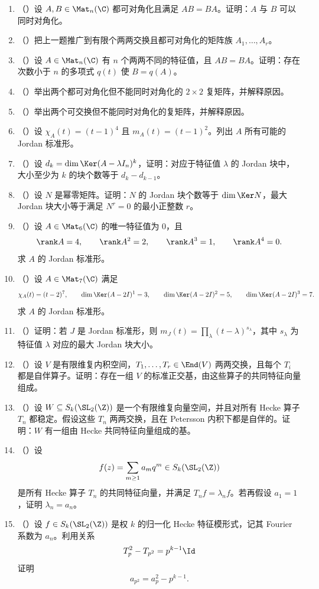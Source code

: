 \begin{enumerate}[label=\arabic*., leftmargin=2.8em, resume]
  \item （\hard）设 \(A,B\in \Mat_n(\C)\) 都可对角化且满足 \(AB=BA\)。证明：\(A\) 与 \(B\) 可以同时对角化。
  \item （\hard）把上一题推广到有限个两两交换且都可对角化的矩阵族 \(A_1,\dots,A_r\)。
  \item （\hard）设 \(A\in \Mat_n(\C)\) 有 \(n\) 个两两不同的特征值，且 \(AB=BA\)。证明：存在次数小于 \(n\) 的多项式 \(q(t)\) 使 \(B=q(A)\)。
  \item （\hard）举出两个都可对角化但不能同时对角化的 \(2\times 2\) 复矩阵，并解释原因。
  \item （\hard）举出两个可交换但不能同时对角化的复矩阵，并解释原因。
  \item （\hard）设 \(\chi_A(t)=(t-1)^4\) 且 \(m_A(t)=(t-1)^2\)。列出 \(A\) 所有可能的 Jordan 标准形。
  \item （\hard）设 \(d_k=\dim\Ker(A-\lambda I_n)^k\)，证明：对应于特征值 \(\lambda\) 的 Jordan 块中，大小至少为 \(k\) 的块个数等于 \(d_k-d_{k-1}\)。
  \item （\hard）设 \(N\) 是幂零矩阵。证明：\(N\) 的 Jordan 块个数等于 \(\dim\Ker N\)，最大 Jordan 块大小等于满足 \(N^r=0\) 的最小正整数 \(r\)。
  \item （\hard）设 \(A\in \Mat_6(\C)\) 的唯一特征值为 \(0\)，且
  \[
  \rank A=4,\qquad \rank A^2=2,\qquad \rank A^3=1,\qquad \rank A^4=0.
  \]
  求 \(A\) 的 Jordan 标准形。
  \item （\hard）设 \(A\in \Mat_7(\C)\) 满足
  \[
  \chi_A(t)=(t-2)^7,
  \qquad \dim\Ker(A-2I)^1=3,
  \qquad \dim\Ker(A-2I)^2=5,
  \qquad \dim\Ker(A-2I)^3=7.
  \]
  求 \(A\) 的 Jordan 标准形。
  \item （\hard）证明：若 \(J\) 是 Jordan 标准形，则 \(m_J(t)=\prod_{\lambda}(t-\lambda)^{s_\lambda}\)，其中 \(s_\lambda\) 为特征值 \(\lambda\) 对应的最大 Jordan 块大小。
  \item （\hard）设 \(V\) 是有限维复内积空间，\(T_1,\dots,T_r\in \End(V)\) 两两交换，且每个 \(T_i\) 都是自伴算子。证明：存在一组 \(V\) 的标准正交基，由这些算子的共同特征向量组成。
  \item （\hard）设 \(W\subseteq S_k(\SL_2(\Z))\) 是一个有限维复向量空间，并且对所有 Hecke 算子 \(T_n\) 都稳定。假设这些 \(T_n\) 两两交换，且在 Petersson 内积下都是自伴的。证明：\(W\) 有一组由 Hecke 共同特征向量组成的基。
  \item （\hard）设
  \[
  f(z)=\sum_{m\ge 1} a_m q^m\in S_k(\SL_2(\Z))
  \]
  是所有 Hecke 算子 \(T_n\) 的共同特征向量，并满足 \(T_n f=\lambda_n f\)。若再假设 \(a_1=1\)，证明 \(\lambda_n=a_n\)。
  \item （\hard）设 \(f\in S_k(\SL_2(\Z))\) 是权 \(k\) 的归一化 Hecke 特征模形式，记其 Fourier 系数为 \(a_n\)。利用关系
  \[
  T_p^2-T_{p^2}=p^{k-1}\Id
  \]
  证明
  \[
  a_{p^2}=a_p^2-p^{k-1}.
  \]
\end{enumerate}

